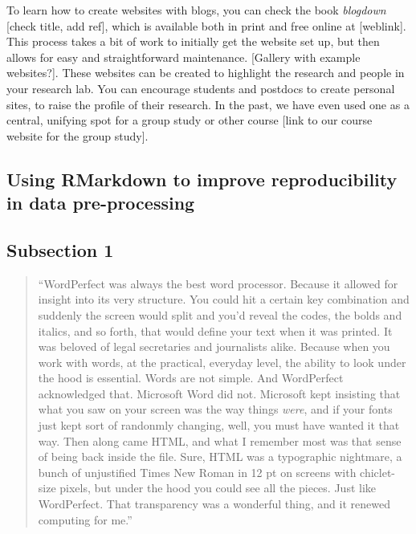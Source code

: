 \documentclass[]{tufte-book}
\begin{document}
To learn how to create websites with blogs, you can check the book \emph{blogdown} {[}check
title, add ref{]}, which is available both in print and free online at {[}weblink{]}. This
process takes a bit of work to initially get the website set up, but then allows for
easy and straightforward maintenance. {[}Gallery with example websites?{]}. These
websites can be created to highlight the research and people in your research lab.
You can encourage students and postdocs to create personal sites, to raise the profile
of their research. In the past, we have even used one as a central, unifying spot
for a group study or other course {[}link to our course website for the group study{]}.

\hypertarget{using-rmarkdown-to-improve-reproducibility-in-data-pre-processing}{%
\subsection{Using RMarkdown to improve reproducibility in data pre-processing}\label{using-rmarkdown-to-improve-reproducibility-in-data-pre-processing}}

\hypertarget{subsection-1-9}{%
\subsection{Subsection 1}\label{subsection-1-9}}

\begin{quote}
``WordPerfect was always the best word processor. Because it allowed for insight into
its very structure. You could hit a certain key combination and suddenly the screen
would split and you'd reveal the codes, the bolds and italics, and so forth,
that would define your text when it was printed. It was beloved of legal secretaries
and journalists alike. Because when you work with words, at the practical, everyday
level, the ability to look under the hood is essential. Words are not simple. And
WordPerfect acknowledged that. Microsoft Word did not. Microsoft kept insisting that
what you saw on your screen was the way things \emph{were}, and if your fonts just kept
sort of randonmly changing, well, you must have wanted it that way. Then along came
HTML, and what I remember most was that sense of being back inside the file. Sure,
HTML was a typographic nightmare, a bunch of unjustified Times New Roman in 12 pt on
screens with chiclet-size pixels, but under the hood you could see all the pieces.
Just like WordPerfect. That transparency was a wonderful thing, and it renewed
computing for me.'' \citep{ford2015on}
\end{quote}
\end{document}
